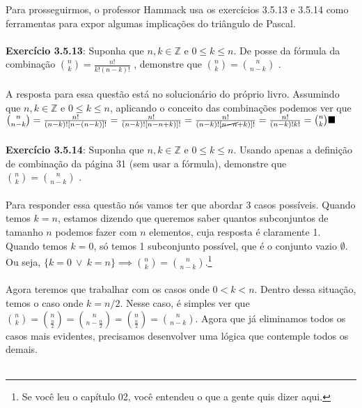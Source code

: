 \documentclass[a4paper,11pt]{book}
\theoremstyle{definition}
\theoremstyle{break}
\begin{document}
Para prosseguirmos, o professor Hammack usa os exercícios 3.5.13 e 3.5.14 como ferramentas para expor algumas implicações do triângulo de Pascal.
\\
\\
\textbf{Exercício 3.5.13}: Suponha que $n,k \in \mathbb{Z}$ e $0 \leq k \leq n$. De posse da fórmula da combinação \tiny ${n \choose k} = \frac{n!}{k!(n-k)!}$ \normalsize , demonstre que \tiny $ {n \choose k} = {n \choose {n-k}} $ \normalsize.
\\
\\
A resposta para essa questão está no solucionário do próprio livro. Assumindo que $ n,k \in \mathbb{Z} $ e $ 0 \leq k \leq n $, aplicando o conceito das combinações podemos ver que \tiny $ {n \choose n - k} = \frac{n!}{(n-k)![n-(n-k)]!} = \frac{n!}{(n-k)![n-n+k)]!} = \frac{n!}{(n-k)![\cancel{n-n}+k)]!} = \frac{n!}{(n-k)!k!} = {n \choose k} \blacksquare$ \normalsize
\\
\\
\textbf{Exercício 3.5.14}: Suponha que $n,k \in \mathbb{Z}$ e $0 \leq k \leq n$. Usando apenas a definição de combinação da página 31 (sem usar a fórmula), demonstre que \tiny $ {n \choose k} = {n \choose {n-k}} $ \normalsize.  
\\
\\
Para responder essa questão nós vamos ter que abordar 3 casos possíveis. Quando temos $ k = n $, estamos dizendo que queremos saber quantos subconjuntos de tamanho $n$ podemos fazer com $n$ elementos, cuja resposta é claramente 1. Quando temos $ k = 0 $, só temos 1 subconjunto possível, que é o conjunto vazio $\emptyset$. Ou seja, $\{k = 0 \ \lor \  k = n\} \implies {n \choose k} = {n \choose n - k}$.\footnote{Se você leu o capítulo 02, você entendeu o que a gente quis dizer aqui.}
\\
\\
Agora teremos que trabalhar com os casos onde $0 < k < n$. Dentro dessa situação, temos o caso onde $k = n/2$. Nesse caso, é simples ver que ${n \choose k} = {n \choose \frac{n}{2}} = {n \choose n - \frac{n}{2}} = {n \choose \frac{n}{2}} = {n \choose n - k}$. Agora que já eliminamos todos os casos mais evidentes, precisamos desenvolver uma lógica que contemple todos os demais.
\\
\\
\end{document}
